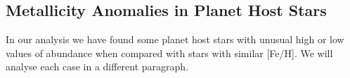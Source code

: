 \documentclass[dvips,12pt,a4paper]{report}
\begin{document}
{{%






\subsection{Metallicity Anomalies in Planet Host Stars}
\label {anomaly}
In our analysis we have found some planet host stars with unusual high or low values of abundance when compared with stars with similar [Fe/H]. We will analyse each case in a different paragraph. 

}}
\end{document}

